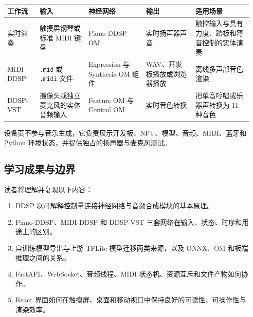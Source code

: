 \begin{longtable}[]{@{}
  >{\raggedright\arraybackslash}p{}
  >{\raggedright\arraybackslash}p{}
  >{\raggedright\arraybackslash}p{}
  >{\raggedright\arraybackslash}p{}
  >{\raggedright\arraybackslash}p{}@{}}
\toprule\noalign{}
\begin{minipage}[b]{\linewidth}\raggedright
工作流
\end{minipage} & \begin{minipage}[b]{\linewidth}\raggedright
输入
\end{minipage} & \begin{minipage}[b]{\linewidth}\raggedright
神经网络
\end{minipage} & \begin{minipage}[b]{\linewidth}\raggedright
输出
\end{minipage} & \begin{minipage}[b]{\linewidth}\raggedright
适用场景
\end{minipage} \\
\midrule\noalign{}
\endhead
\bottomrule\noalign{}
\endlastfoot
实时演奏 & 触摸屏钢琴或标准 MIDI 键盘 & Piano-DDSP OM & 实时扬声器声音 &
触控输入与具有力度、踏板和弯音控制的实体演奏 \\
MIDI-DDSP & \passthrough{\lstinline!.mid!} 或
\passthrough{\lstinline!.midi!} 文件 & Expression 与 Synthesis OM 组件 &
WAV、开发板播放或浏览器播放 & 离线多声部音色渲染 \\
DDSP-VST & 摄像头或独立麦克风的实体音频输入 & Feature OM 与 Control OM &
实时音色转换 & 把单音哼唱或乐器声转换为 11 种音色 \\
\end{longtable}

设备页不参与音乐生成，它负责展示开发板、NPU、模型、音频、MIDI、蓝牙和
Python 环境状态，并提供独占的扬声器与麦克风测试。

\subsection{学习成果与边界}\label{src-experiment-case3-learning-outcomes}

读者将理解并复现以下内容：

\begin{enumerate}
\def\labelenumi{\arabic{enumi}.}
\tightlist
\item
  DDSP 以可解释控制量连接神经网络与音频合成模块的基本原理。
\item
  Piano-DDSP、MIDI-DDSP 和 DDSP-VST
  三套网络在输入、状态、时序和用途上的区别。
\item
  自训练模型导出与上游 TFLite 模型迁移两类来源，以及 ONNX、OM
  和板端推理之间的关系。
\item
  FastAPI、WebSocket、音频线程、MIDI
  状态机、资源互斥和文件产物如何协作。
\item
  React
  界面如何在触摸屏、桌面和移动视口中保持良好的可读性、可操作性与渲染效率。
\end{enumerate}

